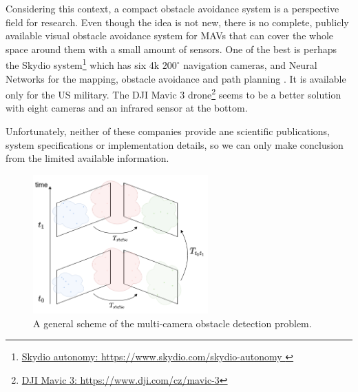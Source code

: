 Considering this context, a compact obstacle avoidance system is a perspective field for research. 
Even though the idea is not new, there is no complete, publicly available visual obstacle avoidance system for MAVs that can cover the whole space around them with a small amount of sensors.
One of the best is perhaps the Skydio system\footnote{\href{https://www.skydio.com/skydio-autonomy}{Skydio autonomy: https://www.skydio.com/skydio-autonomy }} which has six 4k $200^\circ$ navigation cameras, and Neural Networks for the mapping, obstacle avoidance and path planning \cite{Skydio}. 
It is available only for the US military.
The DJI Mavic 3 drone\footnote{\href{https://www.dji.com/cz/mavic-3}{DJI Mavic 3: https://www.dji.com/cz/mavic-3}} seems to be a better solution with eight cameras and an infrared sensor at the bottom.

Unfortunately, neither of these companies provide ane scientific publications, system specifications or implementation details, so we can only make conclusion from the limited available information.

\begin{figure}[t]
    \centering
    \includegraphics[width=0.6\textwidth]{graphics/general_scheme.png}
    \caption{ A general scheme of the multi-camera obstacle detection problem.}
    \label{fig:intro_general}
\end{figure}

